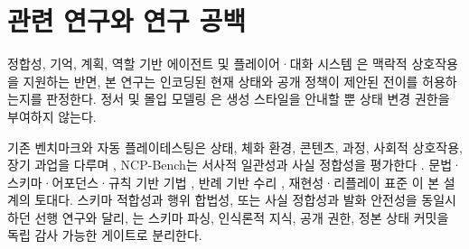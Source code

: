 \section{관련 연구와 연구 공백}
정합성, 기억, 계획, 역할 기반 에이전트 \cite{S03_weir2024ontologically,S20_ashby2023personalized,S07_park2023generative,S08_shao2023character} 및 플레이어·대화 시스템 \cite{S21_akoury2023player,S22_hochreiter2026beyond,S23_yin2026contextualized,S02_figueiredo2025scaffolded}은 맥락적 상호작용을 지원하는 반면, 본 연구는 인코딩된 현재 상태와 공개 정책이 제안된 전이를 허용하는지를 판정한다. 정서 및 몰입 모델링 \cite{S24_yannakakis2011experiencedriven,S25_melhart2020engagement,S26_wang2026engagement}은 생성 스타일을 안내할 뿐 상태 변경 권한을 부여하지 않는다.

기존 벤치마크와 자동 플레이테스팅은 상태, 체화 환경, 콘텐츠, 과정, 사회적 상호작용, 장기 과업을 다루며 \cite{S11_cote2019textworld,S12_wang2022scienceworld,S13_fan2022minedojo,S14_perezliebana2019gvgai,S15_liu2024agentbench,S16_ma2024agentboard,S17_zhou2024sotopia,S18_paglieri2025balrog,S19_lepelletier2022playtesting}, NCP-Bench는 서사적 일관성과 사실 정합성을 평가한다 \cite{S58_ma2026ncpbench}. 문법·스키마·어포던스·규칙 기반 기법 \cite{S09_geng2023grammar,S10_beurerkellner2023prompting,S36_scholak2021picard,S50_kambhampati2024llmmodulo,S51_ichter2023saycan,S52_wang2025agentspec,S53_li2025settingdc,S54_zhou2025story2game,S42_buongiorno2024pangea}, 반례 기반 수리 \cite{S45_madaan2023selfrefine,S48_shinn2023reflexion,S46_chen2023selfdebug,S47_solarlezama2006sketching}, 재현성·리플레이 표준 \cite{S31_agarwal2021precipice,S33_pineau2021reproducibility,S56_feng2025agentrr,S59_sun2025bdc}이 본 설계의 토대다. 스키마 적합성과 행위 합법성, 또는 사실 정합성과 발화 안전성을 동일시하던 선행 연구와 달리, \system{}는 스키마 파싱, 인식론적 지식, 공개 권한, 정본 상태 커밋을 독립 감사 가능한 게이트로 분리한다.
